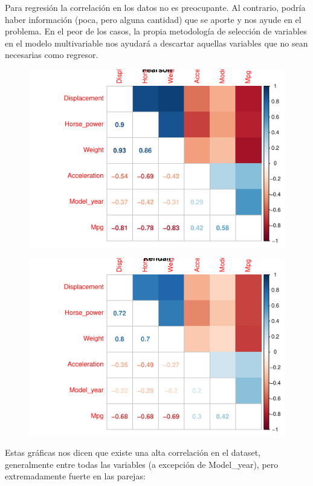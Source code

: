 \vspace{\baselineskip}

Para regresión la correlación en los datos no es preocupante. Al contrario, podría haber información (poca, pero alguna cantidad) que se aporte y nos ayude en el problema. En el peor de los casos, la propia metodología de selección de variables en el modelo multivariable nos ayudará a descartar aquellas variables que no sean necesarias como regresor.

\begin{figure}[H]\includegraphics[width=.9\linewidth]{img/EDA_files/figure-latex/unnamed-chunk-19-1} \caption{}\end{figure}
\begin{figure}[H]\includegraphics[width=.9\linewidth]{img/EDA_files/figure-latex/unnamed-chunk-19-2} \caption{}\end{figure}

Estas gráficas nos dicen que existe una alta correlación en el dataset, generalmente entre todas las variables (a excepción de Model\_year), pero extremadamente fuerte en las parejas:

